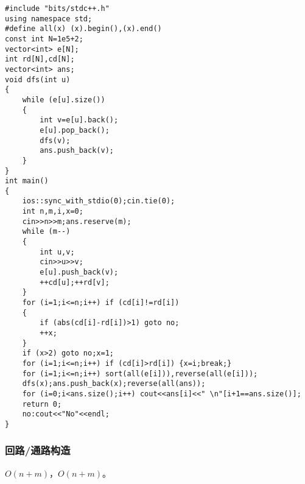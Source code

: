 \documentclass[12pt]{ctexart}
\begin{document}
\begin{lstlisting}
#include "bits/stdc++.h"
using namespace std;
#define all(x) (x).begin(),(x).end()
const int N=1e5+2;
vector<int> e[N];
int rd[N],cd[N];
vector<int> ans;
void dfs(int u)
{
	while (e[u].size())
	{
		int v=e[u].back();
		e[u].pop_back();
		dfs(v);
		ans.push_back(v);
	}
}
int main()
{
	ios::sync_with_stdio(0);cin.tie(0);
	int n,m,i,x=0;
	cin>>n>>m;ans.reserve(m);
	while (m--)
	{
		int u,v;
		cin>>u>>v;
		e[u].push_back(v);
		++cd[u];++rd[v];
	}
	for (i=1;i<=n;i++) if (cd[i]!=rd[i])
	{
		if (abs(cd[i]-rd[i])>1) goto no;
		++x;
	}
	if (x>2) goto no;x=1;
	for (i=1;i<=n;i++) if (cd[i]>rd[i]) {x=i;break;}
	for (i=1;i<=n;i++) sort(all(e[i])),reverse(all(e[i]));
	dfs(x);ans.push_back(x);reverse(all(ans));
	for (i=0;i<ans.size();i++) cout<<ans[i]<<" \n"[i+1==ans.size()];
	return 0;
	no:cout<<"No"<<endl;
}
\end{lstlisting}

\subsubsection{回路/通路构造}

$O(n+m)$，$O(n+m)$。
\end{document}
